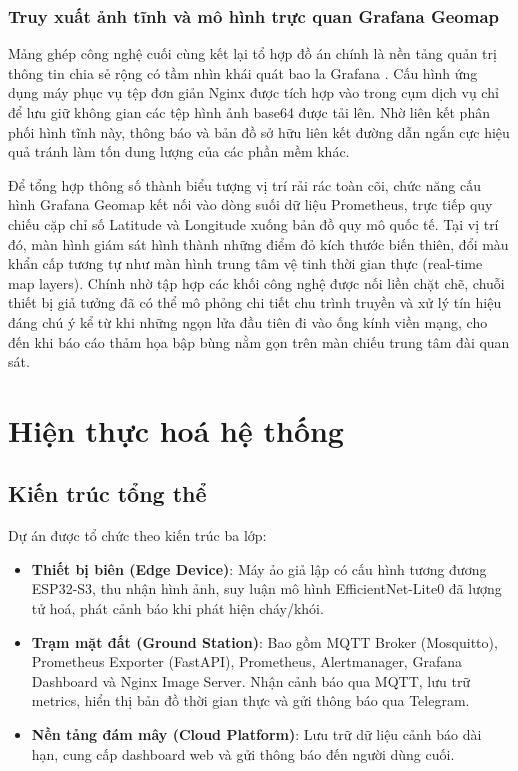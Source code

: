 \documentclass[12pt,a4paper]{report}
\begin{document}
\subsection{Truy xuất ảnh tĩnh và mô hình trực quan Grafana Geomap}

Mảng ghép công nghệ cuối cùng kết lại tổ hợp đồ án chính là nền tảng quản trị thông tin chia sẻ rộng có tầm nhìn khái quát bao la Grafana \cite{grafana}. Cấu hình ứng dụng máy phục vụ tệp đơn giản Nginx được tích hợp vào trong cụm dịch vụ chỉ để lưu giữ không gian các tệp hình ảnh base64 được tải lên. Nhờ liên kết phân phối hình tĩnh này, thông báo và bản đồ sở hữu liên kết đường dẫn ngắn cực hiệu quả tránh làm tốn dung lượng của các phần mềm khác.

Để tổng hợp thông số thành biểu tượng vị trí rải rác toàn cõi, chức năng cấu hình Grafana Geomap kết nối vào dòng suối dữ liệu Prometheus, trực tiếp quy chiếu cặp chỉ số Latitude và Longitude xuống bản đồ quy mô quốc tế. Tại vị trí đó, màn hình giám sát hình thành những điểm đỏ kích thước biến thiên, đổi màu khẩn cấp tương tự như màn hình trung tâm vệ tinh thời gian thực (real-time map layers). Chính nhờ tập hợp các khối công nghệ được nối liền chặt chẽ, chuỗi thiết bị giả tưởng đã có thể mô phỏng chi tiết chu trình truyền và xử lý tín hiệu đáng chú ý kể từ khi những ngọn lửa đầu tiên đi vào ống kính viền mạng, cho đến khi báo cáo thảm họa bập bùng nằm gọn trên màn chiếu trung tâm đài quan sát.

\chapter{Hiện thực hoá hệ thống}

\section{Kiến trúc tổng thể}

Dự án được tổ chức theo kiến trúc ba lớp:
\begin{itemize}
  \item \textbf{Thiết bị biên (Edge Device)}: Máy ảo giả lập có cấu hình tương đương ESP32-S3, thu nhận hình ảnh, suy luận mô hình EfficientNet-Lite0 đã lượng tử hoá, phát cảnh báo khi phát hiện cháy/khói.
  \item \textbf{Trạm mặt đất (Ground Station)}: Bao gồm MQTT Broker (Mosquitto), Prometheus Exporter (FastAPI), Prometheus, Alertmanager, Grafana Dashboard và Nginx Image Server. Nhận cảnh báo qua MQTT, lưu trữ metrics, hiển thị bản đồ thời gian thực và gửi thông báo qua Telegram.
  \item \textbf{Nền tảng đám mây (Cloud Platform)}: Lưu trữ dữ liệu cảnh báo dài hạn, cung cấp dashboard web và gửi thông báo đến người dùng cuối.
\end{itemize}
\end{document}

